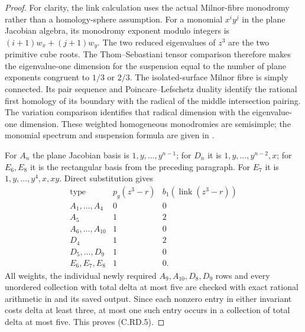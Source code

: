 \begin{proof}
For clarity, the link calculation uses the actual
Milnor-fibre monodromy rather than a homology-sphere
assumption. For a monomial $x^i y^j$ in the plane
Jacobian algebra, its monodromy exponent modulo
integers is $(i+1)w_x+(j+1)w_y$. The two reduced
eigenvalues of $z^3$ are the two primitive cube
roots. The Thom--Sebastiani tensor comparison
therefore makes the eigenvalue-one dimension for
the suspension equal to the number of plane
exponents congruent to $1/3$ or $2/3$.
The isolated-surface Milnor fibre is simply
connected. Its pair sequence and Poincare--Lefschetz
duality identify the rational first homology of
its boundary with the radical of the middle
intersection pairing. The variation comparison
identifies that radical dimension with the
eigenvalue-one dimension. These weighted homogeneous
monodromies are semisimple; the monomial spectrum
and suspension formula are given in
\cite[pp. 165--167]{Steenbrink1989Spectrum}.

For $A_n$ the plane Jacobian basis is
$1,y,\ldots,y^{n-1}$; for $D_n$ it is
$1,y,\ldots,y^{n-2},x$; for $E_6,E_8$ it is the
rectangular basis from the preceding paragraph.
For $E_7$ it is $1,y,\ldots,y^4,x,xy$.
Direct substitution gives
\[
\begin{array}{c|c|c}
 \text{type}&p_g(z^3-r)&b_1(\operatorname{link}(z^3-r))\\\hline
 A_1,\ldots,A_4&0&0\\
 A_5&1&2\\
 A_6,\ldots,A_{10}&1&0\\
 D_4&1&2\\
 D_5,\ldots,D_9&1&0\\
 E_6,E_7,E_8&1&0.
\end{array}
\tag{C.RD.10}
\]
All weights, the individual newly required
$A_9,A_{10},D_8,D_9$ rows and every unordered
collection with total delta at most five are
checked with exact rational arithmetic in
 and its saved output.
Since each nonzero entry in either invariant
costs delta at least three, at most one such
entry occurs in a collection of total delta
at most five. This proves (C.RD.5).
\end{proof}

